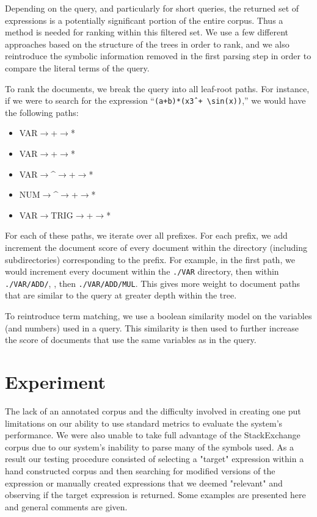 \documentclass{sig-alternate}
\begin{document}
Depending on the query, and particularly for short queries, the returned set of expressions is a potentially
significant portion of the entire corpus. Thus a method is needed for ranking within this filtered set. We 
use a few different approaches based on the structure of the trees in order to rank, and we also reintroduce
the symbolic information removed in the first parsing step in order to compare the literal terms of the query.

To rank the documents, we break the query into all leaf-root paths.  For instance, if we were to search for the expression ``\texttt{(a+b)*(x\^3 + \textbackslash sin(x))},'' we would have the following paths:
\begin{itemize}
\item VAR$\rightarrow$+$\rightarrow$*
\item VAR$\rightarrow$+$\rightarrow$*
\item VAR$\rightarrow$\textasciicircum$\rightarrow$+$\rightarrow$*
\item NUM$\rightarrow$\textasciicircum$\rightarrow$+$\rightarrow$*
\item VAR$\rightarrow$TRIG$\rightarrow$+$\rightarrow$*
\end{itemize}

For each of these paths, we iterate over all prefixes.  For each prefix, we add increment the document score of every document within the directory (including subdirectories) corresponding to the prefix.  For example, in the first path, we would increment every document within the \texttt{./VAR} directory, then within \texttt{./VAR/ADD/}, , then \texttt{./VAR/ADD/MUL}.  This gives more weight to document paths that are similar to the query at greater depth within the tree.

To reintroduce term matching, we use a boolean similarity  model on the variables (and numbers) used in a query.  This similarity is then used to further increase the score of documents that use the same variables as in the query.


\section{Experiment}
The lack of an annotated corpus and the difficulty involved in creating one put limitations on our ability
to use standard metrics to evaluate the system's performance. We were also unable to take full advantage of the 
StackExchange corpus due to our system's inability to parse many of the symbols used. As a result our testing procedure consisted of selecting a "target" expression within a hand constructed corpus and then searching for modified versions of the expression or manually created expressions that we deemed "relevant" and observing if the target expression is returned. Some examples are presented here and general comments are given. 
\end{document}
